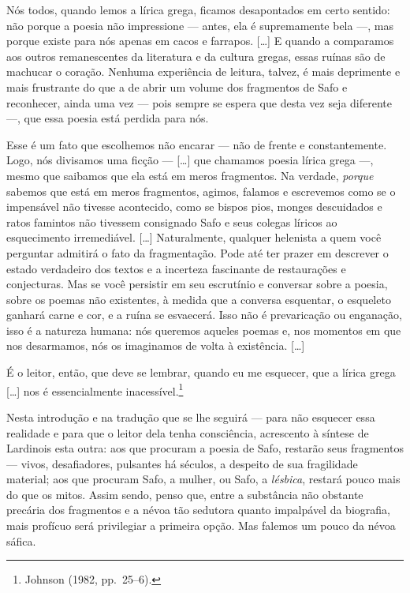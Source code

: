 \begin{hedraquote}
Nós todos, quando lemos a lírica grega, ficamos desapontados em certo sentido:
não porque a poesia não impressione --- antes, ela é supremamente bela ---, mas
porque existe para nós apenas em cacos e farrapos. [\ldots{}] E quando a comparamos
aos outros remanescentes da literatura e da cultura gregas, essas ruínas são de
machucar o coração. Nenhuma experiência de leitura, talvez, é mais deprimente e
mais frustrante do que a de abrir um volume dos fragmentos de Safo e
reconhecer, ainda uma vez --- pois sempre se espera que desta vez seja diferente
---, que essa poesia está perdida para nós.

Esse é um fato que escolhemos não encarar --- não de frente e constantemente.
Logo, nós divisamos uma ficção --- [\ldots{}] que chamamos poesia lírica grega ---,
mesmo que saibamos que ela está em meros fragmentos. Na verdade,
\textit{porque} sabemos que está em meros fragmentos, agimos, falamos
e escrevemos como se o impensável não tivesse acontecido, como se bispos pios,
monges descuidados e ratos famintos não tivessem consignado Safo e seus colegas
líricos ao esquecimento irremediável. [\ldots{}] Naturalmente, qualquer helenista a
quem você perguntar admitirá o fato da fragmentação. Pode até ter prazer em
descrever o estado verdadeiro dos textos e a incerteza fascinante de
restaurações e conjecturas. Mas se você persistir em seu escrutínio e conversar
sobre a poesia, sobre os poemas não existentes, à medida que a conversa
esquentar, o esqueleto ganhará carne e cor, e a ruína se esvaecerá. Isso não é
prevaricação ou enganação, isso é a natureza humana: nós queremos aqueles
poemas e, nos momentos em que nos desarmamos, nós os imaginamos de volta à
existência. [\ldots{}]

É o leitor, então, que deve se lembrar, quando eu me esquecer, que a lírica
grega [\ldots{}] nos é essencialmente inacessível.\footnote{ Johnson (1982, pp.~25--6).}
\end{hedraquote}

Nesta introdução e na tradução que se lhe seguirá ---
para não esquecer essa realidade e para que o leitor dela tenha consciência,
acrescento à síntese de Lardinois esta outra: aos que procuram a poesia de
Safo, restarão seus fragmentos --- vivos, desafiadores, pulsantes há séculos, a
despeito de sua fragilidade material; aos que procuram Safo, a mulher, ou Safo,
a \textit{lésbica}, restará pouco mais do que os mitos. Assim sendo, penso que,
entre a substância não obstante precária dos fragmentos e a névoa tão sedutora
quanto impalpável da biografia, mais profícuo será privilegiar a primeira
opção. Mas falemos um pouco da névoa sáfica.


